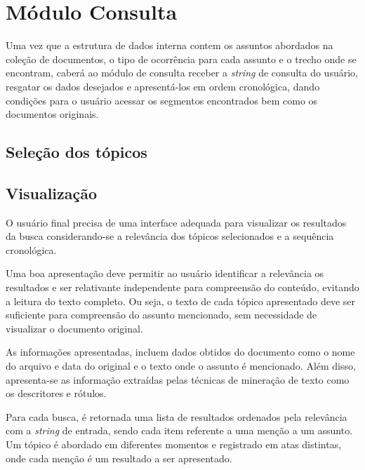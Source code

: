 


\section{Módulo Consulta}

Uma vez que a estrutura de dados interna contem os assuntos abordados na coleção de documentos, o tipo de ocorrência para cada assunto e o trecho onde se encontram, caberá ao módulo de consulta receber a \textit{string} de consulta do usuário, resgatar os dados desejados e apresentá-los em ordem cronológica, dando condições para o usuário acessar os segmentos encontrados bem como os documentos originais.

\subsection{Seleção dos tópicos}

\subsection{Visualização}

O usuário final precisa de uma interface adequada para visualizar os resultados da busca considerando-se a relevância dos tópicos selecionados e a sequência cronológica.

Uma boa apresentação deve permitir ao usuário identificar a relevância os resultados e ser relativante independente para compreensão do conteúdo, evitando a leitura do texto completo. Ou seja, o texto de cada tópico apresentado deve ser suficiente para compreensão do assunto mencionado, sem necessidade de visualizar o documento original.

As informações apresentadas, incluem dados obtidos do documento como o nome do arquivo e data do original e o texto onde o assunto é mencionado. Além disso, apresenta-se as informação extraídas pelas técnicas de mineração de texto como os descritores e rótulos.


Para cada busca, é retornada uma lista de resultados ordenados pela relevância com a \textit{string} de entrada, sendo cada item referente a uma menção a um assunto. Um tópico é abordado em diferentes momentos e registrado em atas distintas, onde cada menção é um resultado a ser apresentado. 

